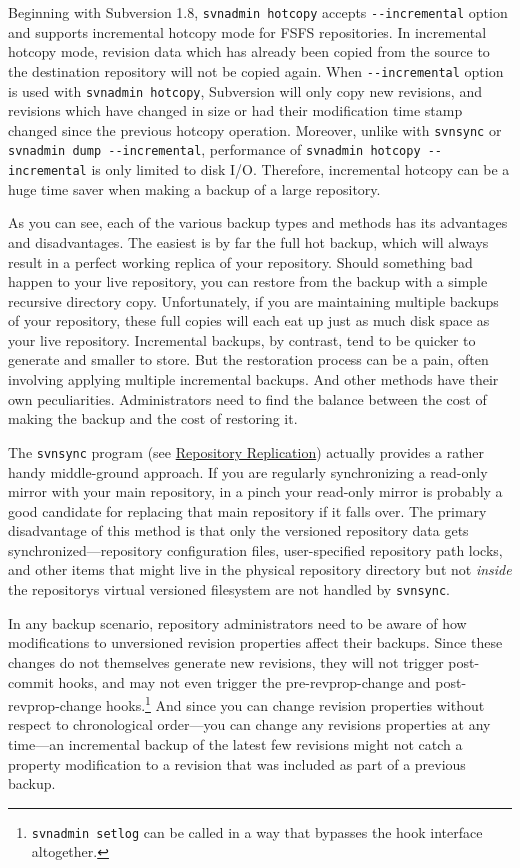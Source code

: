 Beginning with Subversion 1.8, \texttt{svnadmin\ hotcopy} accepts
\texttt{-\/-incremental} option and supports incremental hotcopy mode
for FSFS repositories. In incremental hotcopy mode, revision data which
has already been copied from the source to the destination repository
will not be copied again. When \texttt{-\/-incremental} option is used
with \texttt{svnadmin\ hotcopy}, Subversion will only copy new
revisions, and revisions which have changed in size or had their
modification time stamp changed since the previous hotcopy operation.
Moreover, unlike with \texttt{svnsync} or
\texttt{svnadmin\ dump\ -\/-incremental}, performance of
\texttt{svnadmin\ hotcopy\ -\/-incremental} is only limited to disk I/O.
Therefore, incremental hotcopy can be a huge time saver when making a
backup of a large repository.

As you can see, each of the various backup types and methods has its
advantages and disadvantages. The easiest is by far the full hot backup,
which will always result in a perfect working replica of your
repository. Should something bad happen to your live repository, you can
restore from the backup with a simple recursive directory copy.
Unfortunately, if you are maintaining multiple backups of your
repository, these full copies will each eat up just as much disk space
as your live repository. Incremental backups, by contrast, tend to be
quicker to generate and smaller to store. But the restoration process
can be a pain, often involving applying multiple incremental backups.
And other methods have their own peculiarities. Administrators need to
find the balance between the cost of making the backup and the cost of
restoring it.

The \texttt{svnsync} program (see
\hyperref[svn.reposadmin.maint.replication]{Repository Replication})
actually provides a rather handy middle-ground approach. If you are
regularly synchronizing a read-only mirror with your main repository, in
a pinch your read-only mirror is probably a good candidate for replacing
that main repository if it falls over. The primary disadvantage of this
method is that only the versioned repository data gets
synchronized---repository configuration files, user-specified repository
path locks, and other items that might live in the physical repository
directory but not \emph{inside} the repository\textquotesingle s virtual
versioned filesystem are not handled by \texttt{svnsync}.

In any backup scenario, repository administrators need to be aware of
how modifications to unversioned revision properties affect their
backups. Since these changes do not themselves generate new revisions,
they will not trigger post-commit hooks, and may not even trigger the
pre-revprop-change and post-revprop-change hooks.\footnote{\texttt{svnadmin\ setlog}
  can be called in a way that bypasses the hook interface altogether.}
And since you can change revision properties without respect to
chronological order---you can change any revision\textquotesingle s
properties at any time---an incremental backup of the latest few
revisions might not catch a property modification to a revision that was
included as part of a previous backup.

